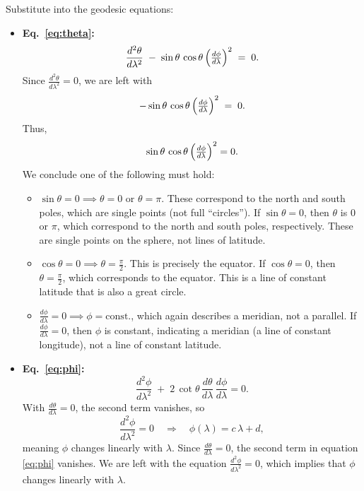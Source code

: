 Substitute into the geodesic equations:

\begin{itemize}
\item \textbf{Eq.~\eqref{eq:theta}:}
\[
\frac{d^2 \theta}{d\lambda^2}
\;-\;
\sin\theta \,\cos\theta \,\Bigl(\tfrac{d\phi}{d\lambda}\Bigr)^2
\;=\; 0.
\]
Since \(\tfrac{d^2\theta}{d\lambda^2} = 0\), we are left with
\[
-\sin\theta \,\cos\theta \,\Bigl(\tfrac{d\phi}{d\lambda}\Bigr)^2
\;=\;
0.
\]
Thus,
\[
\sin\theta\,\cos\theta\,\Bigl(\tfrac{d\phi}{d\lambda}\Bigr)^2 = 0.
\]
We conclude one of the following must hold:

\begin{itemize}
\item \(\sin\theta = 0 \implies \theta=0 \text{ or } \theta=\pi\). These correspond to the north and south poles, which are single points (not full ``circles''). If \(\sin\theta = 0\), then \(\theta\) is \(0\) or \(\pi\), which correspond to the north and south poles, respectively. These are single points on the sphere, not lines of latitude.

\item \(\cos\theta = 0 \implies \theta = \tfrac{\pi}{2}\). This is precisely the equator. If \(\cos\theta = 0\), then \(\theta = \tfrac{\pi}{2}\), which corresponds to the equator. This is a line of constant latitude that is also a great circle.

\item \(\tfrac{d\phi}{d\lambda} = 0 \implies \phi=\text{const.}\), which again describes a meridian, not a parallel. If \(\tfrac{d\phi}{d\lambda} = 0\), then \(\phi\) is constant, indicating a meridian (a line of constant longitude), not a line of constant latitude.
\end{itemize}

\item \textbf{Eq.~\eqref{eq:phi}:}
\[
\frac{d^2 \phi}{d\lambda^2}
\;+\;
2 \,\cot\theta\,\frac{d\theta}{d\lambda}\,\frac{d\phi}{d\lambda}
= 0.
\]
With \(\tfrac{d\theta}{d\lambda} = 0\), the second term vanishes, so
\[
\frac{d^2 \phi}{d\lambda^2} = 0
\quad\Longrightarrow\quad
\phi(\lambda) = c\,\lambda + d,
\]
meaning \(\phi\) changes linearly with \(\lambda\). Since \(\tfrac{d\theta}{d\lambda} = 0\), the second term in equation \eqref{eq:phi} vanishes. We are left with the equation \(\tfrac{d^2 \phi}{d\lambda^2} = 0\), which implies that \(\phi\) changes linearly with \(\lambda\).
\end{itemize}

